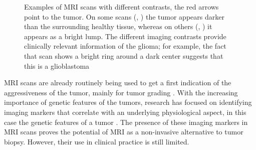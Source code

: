 \begin{figure}[hbt]
    \caption{Examples of \acrshort{MRI} scans with different contrasts, the red arrows point to the \gls{tumor}.
    On some scans (\textbf{\protect{}}, \textbf{\protect{}}) the \gls{tumor} appears darker than the surrounding healthy tissue, whereas on others (\textbf{\protect{}}, \textbf{\protect{}}) it appears as a bright lump.
     The different imaging contrasts provide clinically relevant information of the glioma; for example, the fact that scan \textbf{\protect{}} shows a bright ring around a dark center suggests that this is a glioblastoma}\label{fig:intro_MR_example}
\end{figure}

\gls{MRI} scans are already routinely being used to get a first indication of the aggressiveness of the \gls{tumor}, mainly for \gls{tumor} grading \autocite{upadhyay2011MRIevaluation}.
With the increasing importance of genetic features of the \glspl{tumor}, research has focused on identifying imaging markers that correlate with an underlying physiological aspect, in this case the genetic features of a \gls{tumor} \autocite{patel2017mismatch, smits2016imaging}.
The presence of these imaging markers in \gls{MRI} scans proves the potential of \gls{MRI} as a non-invasive alternative to \gls{tumor} biopsy.
However, their use in clinical practice is still limited.

